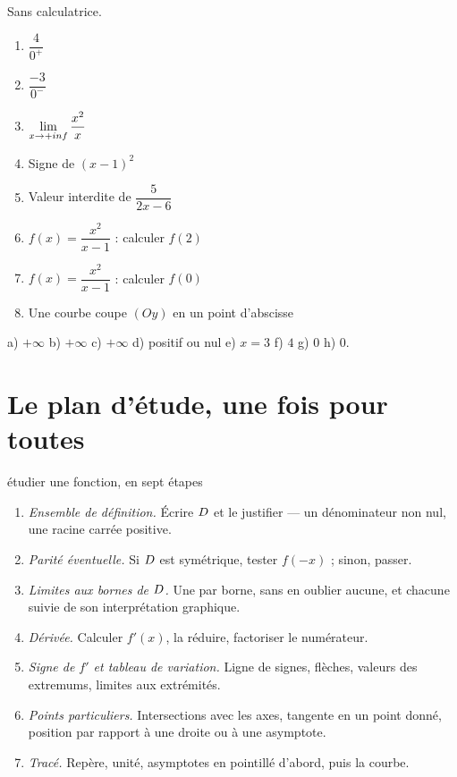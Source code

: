 \begin{automatismes}
Sans calculatrice.

\begin{enumerate}[label=\textbf{\alph*)}, leftmargin=*, itemsep=0.25em]
  \item $\dfrac{4}{0^{+}}$
  \item $\dfrac{-3}{0^{-}}$
  \item $\limpinf \dfrac{x^{2}}{x}$
  \item Signe de $(x-1)^{2}$
  \item Valeur interdite de $\dfrac{5}{2x-6}$
  \item $f(x) = \dfrac{x^{2}}{x-1}$ : calculer $f(2)$
  \item $f(x) = \dfrac{x^{2}}{x-1}$ : calculer $f(0)$
  \item Une courbe coupe $(Oy)$ en un point d'abscisse
\end{enumerate}
\end{automatismes}

\begin{corrige}[automatismes]
a) $+\infty$ \quad b) $+\infty$ \quad c) $+\infty$ \quad d) positif ou nul
\quad e) $x = 3$ \quad f) $4$ \quad g) $0$ \quad h) $0$.
\end{corrige}

\section{Le plan d'étude, une fois pour toutes}

\begin{methode}{étudier une fonction, en sept étapes}
\begin{enumerate}[label=\textbf{\arabic*.}, leftmargin=*, itemsep=0.18em]
  \item \emph{Ensemble de définition.} Écrire $D$ et le justifier — un
        dénominateur non nul, une racine carrée positive.
  \item \emph{Parité éventuelle.} Si $D$ est symétrique, tester $f(-x)$ ;
        sinon, passer.
  \item \emph{Limites aux bornes de $D$.} Une par borne, sans en oublier
        aucune, et chacune suivie de son interprétation graphique.
  \item \emph{Dérivée.} Calculer $f'(x)$, la réduire, factoriser le
        numérateur.
  \item \emph{Signe de $f'$ et tableau de variation.} Ligne de signes,
        flèches, valeurs des extremums, limites aux extrémités.
  \item \emph{Points particuliers.} Intersections avec les axes, tangente en
        un point donné, position par rapport à une droite ou à une
        asymptote.
  \item \emph{Tracé.} Repère, unité, asymptotes en pointillé d'abord, puis
        la courbe.
\end{enumerate}
\end{methode}

